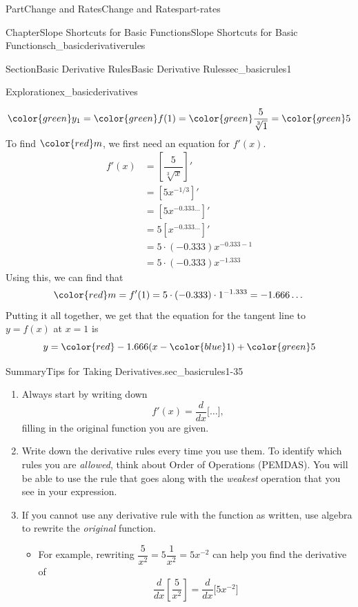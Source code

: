 \documentclass[oneside,10pt,]{tufte-book}
\numberwithin{equation}{chapter}
\newcommand{\red}[1]{   {\color{red}   #1}   }
\newcommand{\blue}[1]{  {\color{blue}  #1}  }
\newcommand{\green}[1]{ {\color{green} #1} }
\newcommand{\ddx}[1]{ \dfrac{d}{dx} \Big[ #1 \Big]  }
\newcommand{\ddxfrac}[1]{ \dfrac{d}{dx} \left[ #1 \right]  }
\newcommand{\amp}{&}
\begin{document}
\begin{partptx}{Part}{Change and Rates}{}{Change and Rates}{}{}{part-rates}
\begin{chapterptx}{Chapter}{Slope Shortcuts for Basic Functions}{}{Slope Shortcuts for Basic Functions}{}{}{ch_basicderivativerules}
\begin{sectionptx}{Section}{Basic Derivative Rules}{}{Basic Derivative Rules}{}{}{sec_basicrules1}
\begin{exploration}{Exploration}{}{ex_basicderivatives}
\begin{enumerate}[font=\bfseries,label=(\alph*),ref=\alph*]
\begin{equation*}
\green{ y_1} = \green{f(1)} = \green{\dfrac{5}{\sqrt[3]{1}}} = \green{5}
\end{equation*}
To find \(\red m\), we first need an equation for \(f'(x)\).%
\begin{align*}
f'(x) \amp  = \left[ \dfrac{5}{\sqrt[3]{x}} \right]'\\
\amp = [ 5x^{-1/3}]'\\
\amp = [5 x^{-0.333\dots}]'\\
\amp = 5 [ x^{-0.333\dots}]'\\
\amp = 5 \cdot (-0.333) x^{-0.333-1}\\
\amp = 5 \cdot (-0.333) x^{-1.333}
\end{align*}
Using this, we can find that%
\begin{equation*}
\red m = f'(1) = 5\cdot (-0.333)\cdot 1^{-1.333} = -1.666\dots
\end{equation*}
Putting it all together, we get that the equation for the tangent line to \(y = f(x)\) at \(x=1\) is%
\begin{equation*}
y = \red{-1.666} (x-\blue{1}) + \green{5}
\end{equation*}
%
\end{enumerate}%
\end{exploration}%
\begin{assemblage}{Summary}{Tips for Taking Derivatives.}{sec_basicrules1-35}%
%
\begin{enumerate}
\item{}Always start by writing down%
\begin{equation*}
f'(x) = \ddx{\dots}\text{,}
\end{equation*}
filling in the original function you are given.%
\item{}Write down the derivative rules every time you use them.  To identify which rules you are \emph{allowed}, think about Order of Operations (PEMDAS).  You will be able to use the rule that goes along with the \emph{weakest} operation that you see in your expression.%
\item{}If you cannot use any derivative rule with the function as written, use algebra to rewrite the \emph{original} function.%
%
\begin{itemize}[label=\textbullet]
\item{}For example, rewriting \(\dfrac{5}{x^2} = 5\dfrac{1}{x^2} = 5x^{-2}\) can help you find the derivative of%
\begin{equation*}
\ddxfrac{\dfrac{5}{x^2}} = \ddx{5x^{-2}}
\end{equation*}

\end{itemize}
\end{enumerate}
\end{assemblage}
\end{sectionptx}
\end{chapterptx}
\end{partptx}
\end{document}
